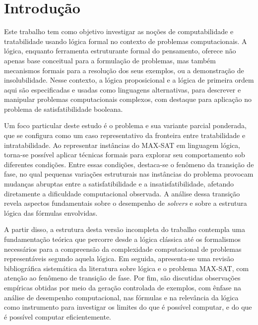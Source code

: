 \chapter{Introdução}

Este trabalho tem como objetivo investigar as noções de computabilidade e tratabilidade usando lógica formal no contexto de problemas computacionais. A lógica, enquanto ferramenta estruturante formal do pensamento, oferece não apenas base conceitual para a formulação de problemas, mas também mecanismos  formais para a resolução dos seus exemplos, ou a demonstração de insolubilidade. Nesse contexto, a lógica proposicional e a lógica de primeira ordem aqui são especificadas e usadas como linguagens alternativas, para descrever e manipular problemas computacionais complexos, com destaque para aplicação no problema de satisfatibilidade booleana.

Um foco particular deste estudo é o problema  e sua variante parcial ponderada, que se configura como um caso representativo da fronteira entre tratabilidade e intratabilidade. Ao representar instâncias do MAX-SAT em linguagem lógica, torna-se possível aplicar técnicas formais para explorar seu comportamento sob diferentes condições. Entre essas condições, destaca-se o fenômeno da transição de fase, no qual pequenas variações estruturais nas instâncias do problema provocam mudanças abruptas entre a satisfatibilidade e a insatisfatibilidade, afetando diretamente a dificuldade computacional observada. A análise dessa transição revela aspectos fundamentais sobre o desempenho de \textit{solvers} e sobre a estrutura lógica das fórmulas envolvidas. 

A partir disso, a estrutura desta versão incompleta do trabalho contempla uma fundamentação teórica que percorre desde a lógica clássica até os formalismos necessários para a compreensão da complexidade computacional de problemas representáveis segundo aquela lógica. Em seguida, apresenta-se uma revisão bibliográfica sistemática da literatura sobre lógica e o problema MAX-SAT, com atenção ao fenômeno de transição de fase. Por fim, são discutidas observações empíricas obtidas por meio da geração controlada de exemplos, com ênfase na análise de desempenho computacional, nas fórmulas e na relevância da lógica como instrumento para investigar os limites do que é possível computar, e do que é possível computar eficientemente.
